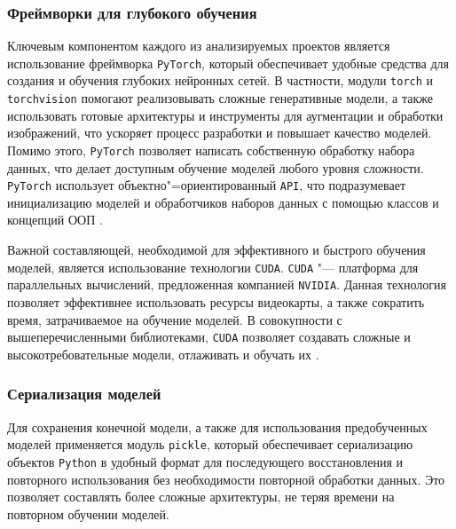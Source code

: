 \subsubsection{Фреймворки для глубокого обучения}
Ключевым компонентом каждого из анализируемых проектов является использование фреймворка \texttt{PyTorch}, который обеспечивает удобные средства для создания и обучения глубоких нейронных сетей. В частности, модули \texttt{torch} и \texttt{torchvision} помогают реализовывать сложные генеративные модели, а также использовать готовые архитектуры и инструменты для аугментации и обработки изображений, что ускоряет процесс разработки и повышает качество моделей. Помимо этого, \texttt{PyTorch} позволяет написать собственную обработку набора данных, что делает доступным обучение моделей любого уровня сложности. \texttt{PyTorch} использует объектно"=ориентированный \texttt{API}, что подразумевает инициализацию моделей и обработчиков наборов данных с помощью классов и концепций ООП \cite{torch}.

Важной составляющей, необходимой для эффективного и быстрого обучения моделей, является использование технологии \texttt{CUDA}. \texttt{CUDA} "--- платформа для параллельных вычислений, предложенная компанией \texttt{NVIDIA}. Данная технология позволяет эффективнее использовать ресурсы видеокарты, а также сократить время, затрачиваемое на обучение моделей. В совокупности с вышеперечисленными библиотеками, \texttt{CUDA} позволяет создавать сложные и высокотребовательные модели, отлаживать и обучать их \cite{cuda}.

\subsubsection{Сериализация моделей}
Для сохранения конечной модели, а также для использования предобученных моделей применяется модуль \texttt{pickle}, который обеспечивает сериализацию объектов \texttt{Python} в удобный формат для последующего восстановления и повторного использования без необходимости повторной обработки данных. Это позволяет составлять более сложные архитектуры, не теряя времени на повторном обучении моделей.

